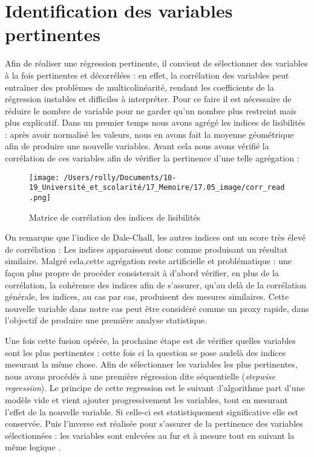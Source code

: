 \documentclass[12pt,a4paper,oneside,titlepage]{book} %
\begin{document}
\section{Identification des variables pertinentes}
Afin de réaliser une régression pertinente, il convient de sélectionner des variables à la fois pertinentes et décorrélées : en effet, la corrélation des variables peut entraîner des problèmes de multicolinéarité, rendant les coefficients de la régression instables et difficiles à interpréter. Pour ce faire il est nécessaire de réduire le nombre de variable pour ne garder qu'un nombre plus restreint mais plus explicatif. 
Dans un premier temps nous avons agrégé les indices de lisibilités : après avoir normalisé les valeurs, nous en avons fait la moyenne géométrique afin de produire une nouvelle variables. Avant cela nous avons vérifié la corrélation de ces variables afin de vérifier la pertinence d'une telle agrégation : 
\begin{figure}[htbp]
	\centering
\texttt{[image: /Users/rolly/Documents/10-19\_Université\_et\_scolarité/17\_Memoire/17.05\_image/corr\_read.png]}
\caption{Matrice de corrélation des indices de lisibilités}
\label{fig_corrread}
\end{figure}

On remarque que l'indice de Dale-Chall, les autres indices ont un score très élevé de corrélation : Les indices apparaissent donc comme produisant un résultat similaire. 
Malgré cela,cette agrégation reste artificielle et problématique : une façon plus \og propre\fg{} de procéder consisterait à d'abord vérifier, en plus de la corrélation, la cohérence des indices afin de s'assurer, qu'au delà de la corrélation générale, les indices, au cas par cas, produisent des mesures similaires. Cette nouvelle variable dans notre cas peut être considéré comme un \og proxy \fg{} rapide, dans l'objectif de produire une première analyse statistique.


Une fois cette fusion opérée, la prochaine étape est de vérifier quelles variables sont les plus pertinentes  : cette fois ci la question se pose audelà des indices mesurant la même chose. Afin de sélectionner les variables les plus pertinentes, nous avons procédés à une première régression dite séquentielle (\emph{stepwise regression}).  Le principe de cette regression est le suivant :l'algorithme part d'une modèle vide et vient ajouter progressivement les variables, tout en mesurant l'effet de la nouvelle variable. Si celle-ci est statistiquement significative elle est conservée. Puis l'inverse est réalisée pour s'assurer de la pertinence des variables sélectionnées : les variables sont enlevées au fur et à mesure tout en suivant la même logique . 
\end{document}
